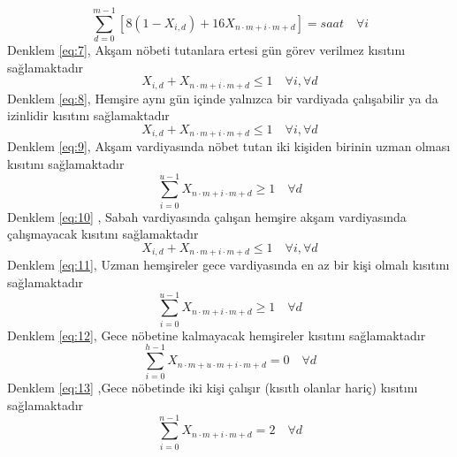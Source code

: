 \documentclass[12pt, a4paper]{article}
\begin{document}
\begin{flushleft}
\begin{equation}
	\label{eq:7}
	\sum_{d=0}^{m-1} \left[ 8 (1 - X_{i,d}) + 16 X_{n \cdot m + i \cdot m + d} \right] = saat \quad \forall i
\end{equation}
Denklem  \ref{eq:7},	Akşam nöbeti tutanlara ertesi gün görev verilmez kısıtını sağlamaktadır  \\[10pt]
\begin{equation}
	\label{eq:8}
	X_{i,d} + X_{n \cdot m + i \cdot m + d} \leq 1 \quad \forall i, \forall d
\end{equation}
Denklem \ref{eq:8}, Hemşire aynı gün içinde yalnızca bir vardiyada çalışabilir ya da izinlidir kısıtını sağlamaktadır   \\[10pt]
\begin{equation}
	\label{eq:9}
	X_{i,d} + X_{n \cdot m + i \cdot m + d} \leq 1 \quad \forall i, \forall d
\end{equation}
Denklem \ref{eq:9}, Akşam vardiyasında nöbet tutan iki kişiden birinin uzman olması kısıtını sağlamaktadır \\[10pt]
\begin{equation}
	\label{eq:10}
	\sum_{i=0}^{u-1} X_{n \cdot m + i \cdot m + d} \geq 1 \quad \forall d
\end{equation}
Denklem \ref{eq:10}	, Sabah vardiyasında çalışan hemşire akşam vardiyasında çalışmayacak	kısıtını sağlamaktadır \\[10pt]		
\begin{equation*}
	\label{eq:11}
	X_{i,d} + X_{n \cdot m + i \cdot m + d} \leq 1 \quad \forall i, \forall d
\end{equation*}
Denklem	\ref{eq:11}, Uzman hemşireler gece vardiyasında en az bir kişi olmalı kısıtını sağlamaktadır \\[10pt]				
\begin{equation}
	\label{eq:12}
	\sum_{i=0}^{u-1} X_{n \cdot m + i \cdot m + d} \geq 1 \quad \forall d
\end{equation}
Denklem	 \ref{eq:12}, Gece nöbetine kalmayacak hemşireler kısıtını sağlamaktadır\\[10pt]				
\begin{equation}
	\label{eq:13}
	\sum_{i=0}^{h-1} X_{n \cdot m + u \cdot m + i \cdot m + d} = 0 \quad \forall d
\end{equation}
Denklem	 \ref{eq:13} ,Gece nöbetinde iki kişi çalışır (kısıtlı olanlar hariç)	kısıtını sağlamaktadır \\[20pt]			
\begin{equation}
	\label{eq:14}
	\sum_{i=0}^{n-1} X_{n \cdot m + i \cdot m + d} = 2 \quad \forall d

\end{equation}
\end{flushleft}
\end{document}
